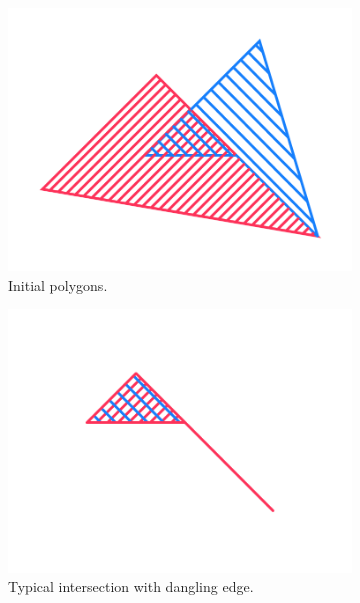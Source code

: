 \documentclass[a4paper,11pt,oneside]{article}
\begin{document}
 
\begin{figure}[ht]
	\centering
	\begin{subfigure}[b]{0.3\textwidth}
		\centering
		\includegraphics[width=\textwidth]{section3/3.2/regularization-initial.png}
		\caption{Initial polygons.}
		\label{sec3.2:initial-intersection}
	\end{subfigure}
	\hfill
	\begin{subfigure}[b]{0.3\textwidth}
		\centering
		\includegraphics[width=\textwidth]{section3/3.2/regularization-non-regular.png}
		\caption{Typical intersection with dangling edge.}
		\label{sec3.2:normal-intersection}
	\end{subfigure}
	\hfill
	\begin{subfigure}[b]{0.3\textwidth}

\end{subfigure}
\end{figure}
\end{document}
